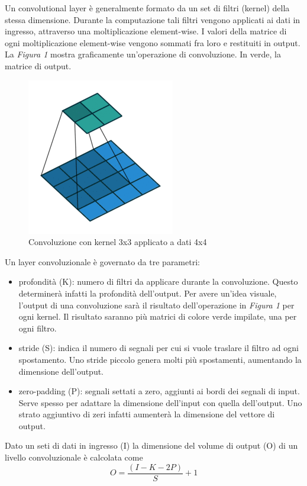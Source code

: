 \documentclass{article}
\begin{document}
Un convolutional layer è generalmente formato da un set di filtri (kernel) della stessa dimensione. Durante la computazione tali filtri vengono applicati ai dati in ingresso, attraverso una moltiplicazione element-wise. I valori della matrice di ogni moltiplicazione element-wise vengono sommati fra loro e restituiti in output.
La \textit{Figura 1} mostra graficamente un'operazione di convoluzione. In verde, la matrice di output.
\begin{figure}[!h]
\centering
\includegraphics[scale=0.7]{convolution}
\caption{Convoluzione con kernel 3x3 applicato a dati 4x4}
\end{figure}

Un layer convoluzionale è governato da tre parametri:
\begin{itemize}
\item profondità (K): numero di filtri da applicare durante la convoluzione. Questo determinerà infatti la profondità dell'output. Per avere un'idea visuale, l'output di una convoluzione sarà il risultato dell'operazione in \textit{Figura 1} per ogni kernel. Il risultato saranno più matrici di colore verde impilate, una per ogni filtro. 
\item stride (S): indica il numero di segnali per cui si vuole traslare il filtro ad ogni spostamento. Uno stride piccolo genera molti più spostamenti, aumentando la dimensione dell'output. 
\item zero-padding (P): segnali settati a zero, aggiunti ai bordi dei segnali di input. Serve spesso per adattare la dimensione dell'input con quella dell'output. Uno strato aggiuntivo di zeri infatti aumenterà la dimensione del vettore di output. 
\end{itemize}

Dato un seti di dati in ingresso (I) la dimensione del volume di output (O) di un livello convoluzionale è calcolata come
\begin{equation}
O={\frac{(I - K - 2P)}{S} +1}
\end{equation}
\end{document}
